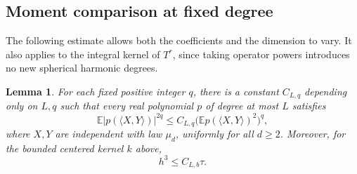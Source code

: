 \documentclass[11pt,reqno]{amsart}
\numberwithin{equation}{section}
\newtheorem{lemma}[theorem]{Lemma}
\theoremstyle{definition}
\theoremstyle{remark}
\theoremstyle{definition}
\begin{document}
\subsection{Moment comparison at fixed degree}
The following estimate allows both the coefficients and the dimension to vary. It also applies to the integral kernel of $T^r$,
since taking operator powers introduces no new spherical harmonic degrees.

\begin{lemma}\label{lem:moments}
For each fixed positive integer $q$, there is a constant $C_{L,q}$ depending only on $L,q$
such that every real polynomial $p$ of degree at most $L$ satisfies
\[
 \mathbb E|p(\langle X,Y\rangle)|^{2q}
 \le C_{L,q}\bigl(\mathbb E p(\langle X,Y\rangle)^2\bigr)^q,
\]
where $X,Y$ are independent with law $\mu_d$, uniformly for all $d\ge2$.
Moreover, for the bounded centered kernel $k$ above,
\begin{equation}\label{eq:h-cube}
 h^3\le C_{L,b}\tau.
\end{equation}
\end{lemma}
\end{document}
